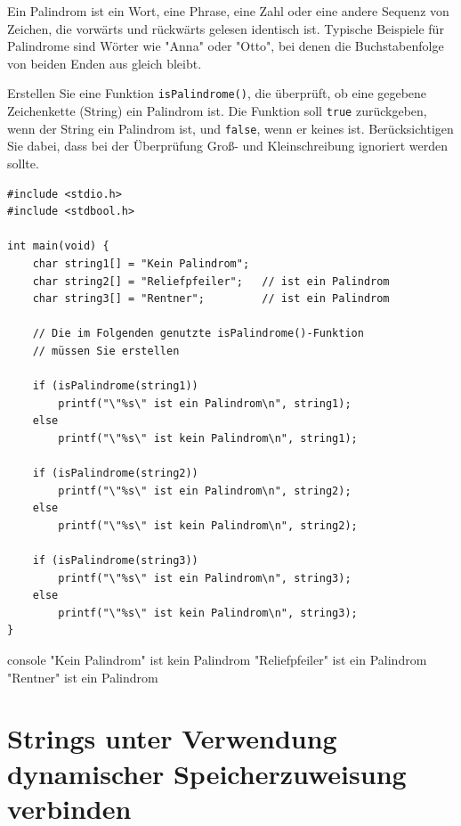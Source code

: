 \vspace{10pt}

Ein Palindrom ist ein Wort, eine Phrase, eine Zahl oder eine andere Sequenz von
Zeichen, die vorwärts und rückwärts gelesen identisch ist. Typische Beispiele
für Palindrome sind Wörter wie "Anna" oder "Otto", bei denen die Buchstabenfolge
von beiden Enden aus gleich bleibt.

Erstellen Sie eine Funktion \texttt{isPalindrome()}, die überprüft, ob
eine gegebene Zeichenkette (String) ein Palindrom ist. Die Funktion soll
\texttt{true} zurückgeben, wenn der String ein Palindrom ist, und
\texttt{false}, wenn er keines ist. Berücksichtigen Sie dabei, dass bei
der Überprüfung Groß- und Kleinschreibung ignoriert werden sollte.

\Vorlage
\begin{verbatim}
#include <stdio.h>
#include <stdbool.h>

int main(void) {
    char string1[] = "Kein Palindrom";
    char string2[] = "Reliefpfeiler";   // ist ein Palindrom
    char string3[] = "Rentner";         // ist ein Palindrom

    // Die im Folgenden genutzte isPalindrome()-Funktion
    // müssen Sie erstellen

    if (isPalindrome(string1))
        printf("\"%s\" ist ein Palindrom\n", string1);
    else
        printf("\"%s\" ist kein Palindrom\n", string1);

    if (isPalindrome(string2))
        printf("\"%s\" ist ein Palindrom\n", string2);
    else
        printf("\"%s\" ist kein Palindrom\n", string2);

    if (isPalindrome(string3))
        printf("\"%s\" ist ein Palindrom\n", string3);
    else
        printf("\"%s\" ist kein Palindrom\n", string3);
}
\end{verbatim}

\begin{mybox}[Bildschirmausgabe]{console}
"Kein Palindrom" ist kein Palindrom
"Reliefpfeiler" ist ein Palindrom
"Rentner" ist ein Palindrom
\end{mybox}




\chapter{Strings unter Verwendung dynamischer Speicherzuweisung verbinden}

\vspace{10pt}

